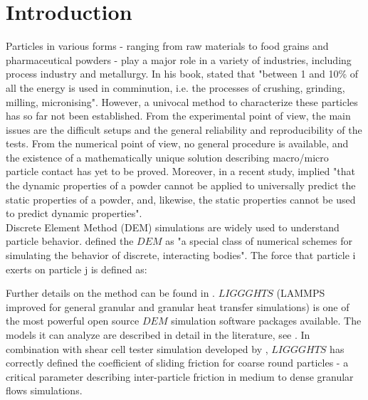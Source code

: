 
\section{Introduction}
\label{sec:introduction}

Particles in various forms - ranging from raw materials to food grains and pharmaceutical powders - play a major role in a variety of industries, including process industry and metallurgy. In his book, \citet{RefWorks:117} stated that "between 1 and 10\% of all the energy is used in comminution, i.e. the processes of crushing, grinding, milling, micronising". 
However, a univocal method to characterize these particles has so far not been established.
From the experimental point of view, the main issues are the difficult setups and the general reliability and reproducibility of the tests. 
From the numerical point of view, no general procedure is available, and the existence of a mathematically unique solution describing macro/micro particle contact has yet to be proved.
Moreover, in a recent study, \citet{RefWorks:56} implied "that the dynamic properties of a powder cannot be applied to universally predict the static properties of a powder, and, likewise, the static properties cannot be used to predict dynamic properties".\\
Discrete Element Method (DEM) simulations are widely used to understand particle behavior.
\citet{RefWorks:135} defined the $DEM$ as "a special class of numerical schemes for simulating the behavior of discrete, interacting bodies".
The force that particle i exerts on particle j is defined as:

Further details on the method can be found in \citet{RefWorks:133}.
$LIGGGHTS$ (LAMMPS improved for general granular and granular heat transfer simulations) is one of the most powerful open source $DEM$ simulation software packages available. 
The models it can analyze are described in detail in the literature, see \citet{RefWorks:136}.\label{par:overviewdemliggghts}
In combination with shear cell tester simulation developed by \citet{RefWorks:139}, $LIGGGHTS$ has correctly defined the coefficient of sliding friction for coarse round particles - 
a critical parameter describing inter-particle friction in medium to dense granular flows simulations.\\
